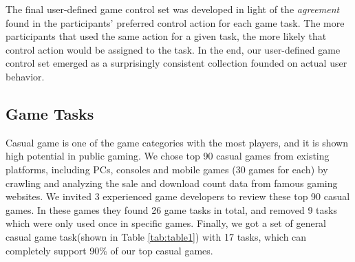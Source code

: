 \documentclass{sigchi}
\begin{document}
    The final user-defined game control set was developed in light of the \textsl{agreement} found in the participants' preferred control action for each game task\cite{Wobbrock:2005:MGS:1056808.1057043}. The more participants that used the same action for a given task, the more likely that control action would be assigned to the task. In the end, our user-defined game control set emerged as a surprisingly consistent collection founded on actual user behavior.


    \subsection {Game Tasks}

    Casual game is one of the game categories with the most players\cite{esa_ef_2014}, and it is shown high potential in public gaming\cite{Jurgelionis:2011:PET:2027456.2027462,Reis:2012:EMC:2405577.2405651,Biskupski:2014:DEB:2559206.2580097}. We chose top 90 casual games\cite{TopGames} from existing platforms, including PCs, consoles and mobile games (30 games for each) by crawling and analyzing the sale and download count data from famous gaming websites\cite{appannie,VGChartz,Steam,GameStop}. We invited 3 experienced game developers to review these top 90 casual games. In these games they found 26 game tasks in total, and removed 9 tasks which were only used once in specific games. Finally, we got a set of general casual game task(shown in Table \ref{tab:table1}) with 17 tasks, which can completely support 90\% of our top casual games. 
\end{document}
